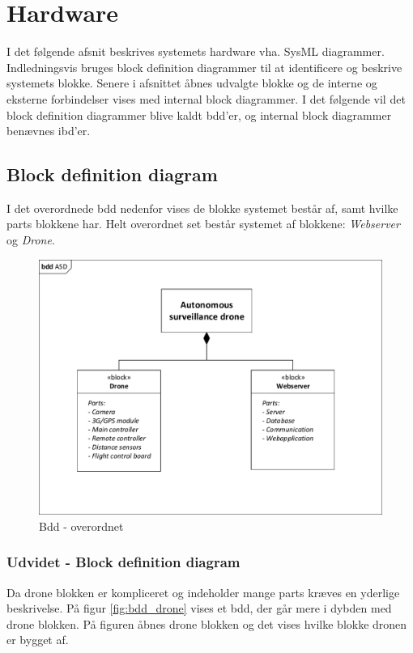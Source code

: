 \chapter{Hardware}

I det følgende afsnit beskrives systemets hardware vha. SysML diagrammer. 
Indledningsvis bruges block definition diagrammer til at identificere og beskrive systemets blokke. Senere i afsnittet åbnes udvalgte blokke og de interne og eksterne forbindelser vises med internal block diagrammer. 
I det følgende vil det block definition diagrammer blive kaldt bdd'er, og internal block diagrammer benævnes ibd'er. 

\section{Block definition diagram}
I det overordnede bdd nedenfor vises de blokke systemet består af, samt hvilke parts blokkene har. Helt overordnet set består systemet af blokkene: \textit{Webserver} og \textit{Drone}. 

\begin{figure}[H]
\centering
\includegraphics[width=1\textwidth]{Billeder/BDD/bdd_overordnet.pdf}
\vspace{-0.5cm}
\caption{Bdd - overordnet}
\label{fig:bdd_overordnet}
\end{figure}

\newpage
\subsection{Udvidet - Block definition diagram}
Da drone blokken er kompliceret og indeholder mange parts kræves en yderlige beskrivelse. På figur \ref{fig:bdd_drone} vises et bdd, der går mere i dybden med drone blokken. På figuren åbnes drone blokken og det vises hvilke blokke dronen er bygget af. 

